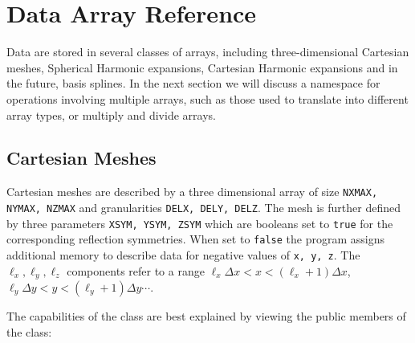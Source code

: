 \documentclass[10pt]{article}
\begin{document}
\section{Data Array Reference}
\label{sec:arrays}

Data are stored in several classes of arrays, including three-dimensional Cartesian meshes, Spherical Harmonic expansions, Cartesian Harmonic expansions and in the future, basis splines. In the next section we will discuss a namespace for operations involving multiple arrays, such as those used to translate into different array types, or multiply and divide arrays.

\subsection{Cartesian Meshes}

Cartesian meshes are described by a three dimensional array of size {\tt NXMAX, NYMAX, NZMAX} and granularities {\tt DELX, DELY, DELZ}. The mesh is further defined by three parameters {\tt XSYM, YSYM, ZSYM} which are booleans set to {\tt true} for the corresponding reflection symmetries. When set to {\tt false} the program assigns additional memory to describe data for negative values of {\tt x, y, z}. The $\ell_x,\ell_y,\ell_z$ components refer to a range $\ell_x\Delta x<x<(\ell_x+1)\Delta x$, $\ell_y\Delta y<y<(\ell_y+1)\Delta y\cdots$.

The capabilities of the class are best explained by viewing the public members of the class:\\
\end{document}

